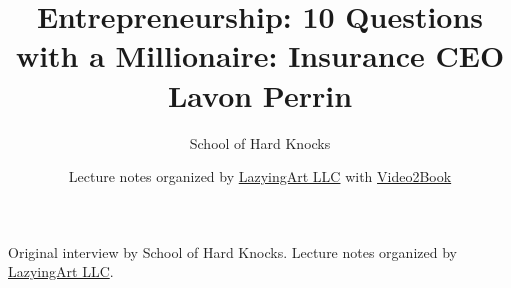 \documentclass[11pt,oneside]{book}
\begin{document}
\frontmatter
\title{Entrepreneurship: 10 Questions with a Millionaire: Insurance CEO Lavon Perrin}
\author{School of Hard Knocks}
\date{Lecture notes organized by \href{https://lazying.art}{LazyingArt LLC} with \href{https://github.com/lachlanchen/Video2Book}{Video2Book}}
\maketitle
\begin{center}
\small Original interview by School of Hard Knocks. Lecture notes organized by \href{https://lazying.art}{LazyingArt LLC}.
\end{center}
\clearpage
\mainmatter

\end{document}
